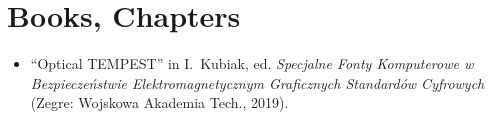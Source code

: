 \section*{Books, Chapters}
\vspace{-3mm}

\begin{itemize}
  \item ``Optical TEMPEST'' in I.\ Kubiak, ed. \emph{Specjalne Fonty
    Komputerowe w Bezpiecze\'{n}stwie Elektromagnetycznym Graficznych
    Standard\'{o}w Cyfrowych} (Zegre: Wojskowa Akademia Tech., 2019).
\end{itemize}

